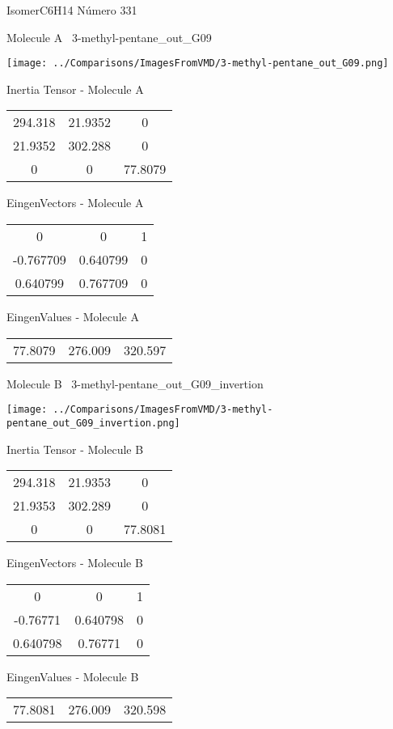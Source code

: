 \vtab[-3cm]
\begin{center}
{\large IsomerC6H14 \tab Número 331}
\end{center}
\begin{multicols}{2}
\begin{center}

Molecule A \
3-methyl-pentane\_out\_G09

\texttt{[image: ../Comparisons/ImagesFromVMD/3-methyl-pentane\_out\_G09.png]}

Inertia Tensor - Molecule A \\
\begin{tabular}{|c c c|}
294.318	 & 	21.9352	 & 	0	 \\
21.9352	 & 	302.288	 & 	0	 \\
0	 & 	0	 & 	77.8079
\end{tabular}

\vtab
 EingenVectors - Molecule A     \\
\begin{tabular}{|c c c|}
0	 & 	0	 & 	1	 \\
-0.767709	 & 	0.640799	 & 	0	 \\
0.640799	 & 	0.767709	 & 	0
\end{tabular}

\vtab
 EingenValues - Molecule A     \\
\begin{tabular}{|c c c|}
77.8079	 & 	276.009	 & 	320.597	 \\
\end{tabular}
\columnbreak

Molecule B \
3-methyl-pentane\_out\_G09\_invertion

\texttt{[image: ../Comparisons/ImagesFromVMD/3-methyl-pentane\_out\_G09\_invertion.png]}

Inertia Tensor - Molecule B \\
\begin{tabular}{|c c c|}
294.318	 & 	21.9353	 & 	0	 \\
21.9353	 & 	302.289	 & 	0	 \\
0	 & 	0	 & 	77.8081
\end{tabular}

\vtab
 EingenVectors - Molecule B     \\
\begin{tabular}{|c c c|}
0	 & 	0	 & 	1	 \\
-0.76771	 & 	0.640798	 & 	0	 \\
0.640798	 & 	0.76771	 & 	0
\end{tabular}

\vtab
 EingenValues - Molecule B     \\
\begin{tabular}{|c c c|}
77.8081	 & 	276.009	 & 	320.598	 \\
\end{tabular}

\end{center}
\end{multicols}

